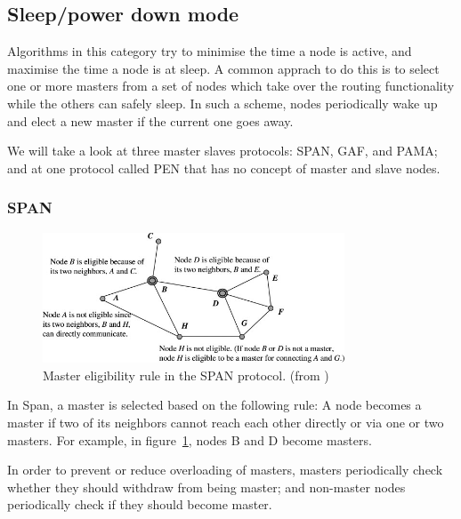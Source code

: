 \documentclass[conference]{IEEEtran}
\begin{document}
\subsection{Sleep/power­ down mode}
Algorithms in this category try to minimise the time a node is active, and
maximise the time a node is at sleep. A common apprach to do this is to select
one or more masters from a set of nodes which take over the routing functionality
while the others can safely sleep. In such a scheme, nodes periodically wake up
and elect a new master if the current one goes away.

We will take a look at three master slaves protocols: SPAN, GAF, and PAMA;
and at one protocol called PEN that has no concept of master and slave nodes.

\subsubsection{SPAN}
\begin{figure}
\centering
\includegraphics[width=0.8\textwidth]{images/span-master-example}
\caption{Master eligibility rule in the SPAN protocol. (from \cite{alotaibi2012survey})}
\label{spanmaster}
\end{figure}
In Span\cite{chen2002span}, a master is selected based on the following rule:
A node becomes a master if two of its neighbors cannot reach each other directly
or via one or two masters. For example, in figure~\ref{spanmaster}, nodes B and
D become masters.

In order to prevent or reduce overloading of masters, masters periodically
check whether they should withdraw from being master; and non-master nodes
periodically check if they should become master.
\end{document}

